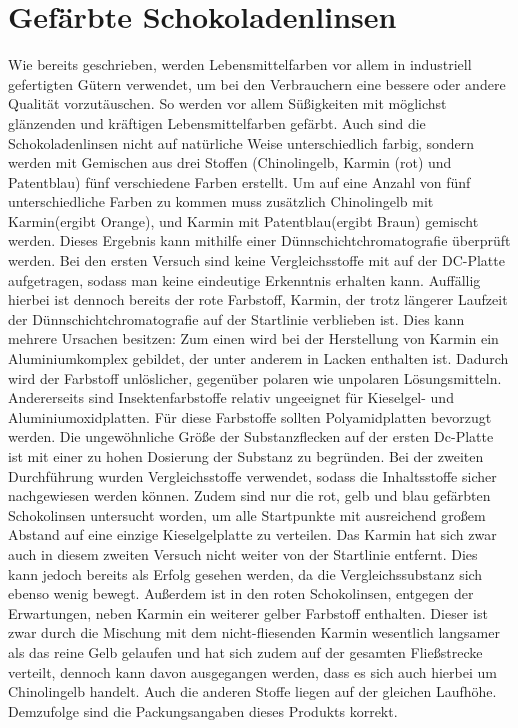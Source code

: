 \documentclass[11pt]{scrreprt}
\begin{document}
\section{Gefärbte Schokoladenlinsen}
Wie bereits geschrieben, werden Lebensmittelfarben vor allem in industriell gefertigten Gütern verwendet, um bei den Verbrauchern eine bessere oder andere Qualität vorzutäuschen. So werden vor allem Süßigkeiten mit möglichst glänzenden und kräftigen Lebensmittelfarben gefärbt. Auch sind die Schokoladenlinsen nicht auf natürliche Weise unterschiedlich farbig, sondern werden mit Gemischen aus drei Stoffen (Chinolingelb, Karmin (rot) und Patentblau) fünf verschiedene Farben erstellt. Um auf eine Anzahl von fünf unterschiedliche Farben zu kommen muss zusätzlich Chinolingelb mit Karmin(ergibt Orange), und Karmin mit Patentblau(ergibt Braun) gemischt werden.
Dieses Ergebnis kann mithilfe einer Dünnschichtchromatografie überprüft werden. Bei den ersten Versuch sind keine Vergleichsstoffe mit auf der DC-Platte aufgetragen, sodass man keine eindeutige Erkenntnis erhalten kann.  Auffällig hierbei ist dennoch bereits der rote Farbstoff, Karmin, der trotz längerer Laufzeit der Dünnschichtchromatografie auf der Startlinie verblieben ist. Dies kann mehrere Ursachen besitzen: Zum einen wird bei der Herstellung von Karmin ein Aluminiumkomplex gebildet, der unter anderem in Lacken enthalten ist. Dadurch wird der Farbstoff unlöslicher, gegenüber polaren wie unpolaren Lösungsmitteln. Andererseits sind Insektenfarbstoffe relativ ungeeignet für Kieselgel- und Aluminiumoxidplatten. Für diese Farbstoffe sollten Polyamidplatten bevorzugt werden. Die ungewöhnliche Größe der Substanzflecken auf der ersten Dc-Platte ist mit einer zu hohen Dosierung der Substanz zu begründen.
 Bei der zweiten Durchführung wurden Vergleichsstoffe verwendet, sodass die Inhaltsstoffe sicher nachgewiesen werden können. Zudem sind nur die rot, gelb und blau gefärbten Schokolinsen untersucht worden, um alle Startpunkte mit ausreichend großem Abstand auf eine einzige Kieselgelplatte zu verteilen.  Das Karmin hat sich zwar auch in diesem zweiten Versuch nicht weiter von der Startlinie entfernt. Dies kann jedoch bereits als Erfolg gesehen werden, da die Vergleichssubstanz sich ebenso wenig bewegt. Außerdem ist in den roten Schokolinsen, entgegen der Erwartungen, neben Karmin ein weiterer gelber Farbstoff enthalten. Dieser ist zwar durch die Mischung mit dem nicht-fliesenden Karmin wesentlich langsamer als das reine Gelb gelaufen und hat sich zudem auf der gesamten Fließstrecke verteilt, dennoch kann davon ausgegangen werden, dass es sich auch hierbei um Chinolingelb handelt. Auch die anderen Stoffe liegen auf der gleichen Laufhöhe. Demzufolge sind die Packungsangaben dieses Produkts korrekt.
\end{document}
